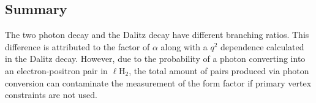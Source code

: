 \subsection{Summary}
The two photon decay and the Dalitz decay have different branching ratios. This difference is attributed to the factor of $\alpha$ along with a $q^2$ dependence calculated in the Dalitz decay. However, due to the probability of a photon converting into an electron-positron pair in $\ell$H$_2$, the total amount of \epem pairs produced via photon conversion can contaminate the measurement of the form factor if primary vertex constraints are not used.
 
